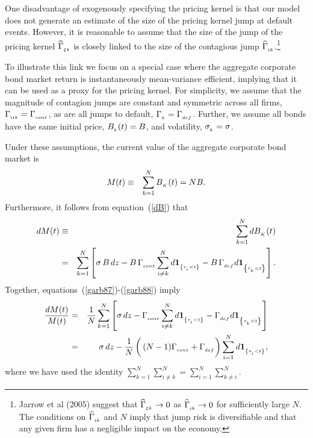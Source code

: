 \documentclass[titlepage,11pt]{article}
\def\bbig{\begin{array}{c} \\ \\ \end{array} \!\!\!\!\!}
\begin{document}
One disadvantage of exogenously specifying the pricing kernel is
that our model does not generate an estimate of the size of the
pricing kernel jump at default events. However, it is reasonable to
assume that the size of the jump of the pricing kernel ${\widehat \Gamma}_{_{{\xi
k}}}$ is closely linked to the size of the contagious jump ${\widehat \Gamma}_{_{{i
k}}}$.\footnote{ Jarrow et al (2005) suggest that
${\widehat \Gamma}_{_{{\xi k}}} \rightarrow 0$ as ${\widehat \Gamma}_{_{{i k}}} \rightarrow 0$ for
sufficiently large $N$.  The conditions on ${\widehat \Gamma}_{_{{i k}}}$
and $N$ imply that jump risk is
diversifiable and that any given firm has a negligible impact on the economy.}

To illustrate this link we focus on a special case where the
aggregate corporate bond market return is instantaneously
mean-variance efficient, implying that it can be used as a proxy for
the pricing kernel. For simplicity, we assume that the magnitude of
contagion jumps are constant and symmetric across all firms,
$\Gamma\sub{\i k} =\Gamma\sub{cont}$, as are all jumps to default,
$\Gamma_{_{{k}}} = \Gamma_{_{{def}}}$. Further, we assume all bonds
have the same initial price, $B_{_{{k}}}(t) = B$, and volatility, $\sigma_{_{{k}}}
= \sigma$.

Under these assumptions, the current value of the aggregate corporate bond
market is
\begin{eqnarray}
M(t) &\equiv& \sum_{k=1}^{N} B_{_{{K}}}(t)= NB. \label{garb87}
\end{eqnarray}
Furthermore, it follows from equation~(\ref{dB}) that
\begin{eqnarray}
dM(t) &\equiv& \sum_{k=1}^{N} dB\sub{K}(t) \nonumber \\
%
&=& \sum_{k=1}^{N} \left[ \sigma \, B \, dz - B \, \Gamma\sub{cont} \sum_{i
\neq k}^{N}
d\ind{\tau\sub{i} < t} - B \, \Gamma\sub{def} d\ind{\tau\sub{k} < t} \right].
\label{garb88}
\end{eqnarray}
Together, equations~(\ref{garb87})-(\ref{garb88}) imply
\begin{eqnarray}
\frac{dM(t)}{M(t)} &=& \frac{1}{N} \sum_{k=1}^{N} \left[ \sigma  \, dz -
\Gamma\sub{cont} \sum_{i \neq k}^{N} d\ind{\tau\sub{i} < t} -  \Gamma\sub{def}
d\ind{\tau\sub{k} < t} \right] \nonumber \\ \label{meanvar22}
%
&=& \sigma  \, dz -  \frac{1}{N} \left( \bbig (N-1) \Gamma\sub{cont} +
\Gamma\sub{def} \right)
\sum_{i=1}^{N} d\ind{\tau\sub{i} < t} ,
\end{eqnarray}
where we have used the identity $\sum_{k=1}^{N}\sum_{i\neq k}^{N} =
\sum_{i=1}^{N}\sum_{k\neq i}^{N}$.
\end{document}

